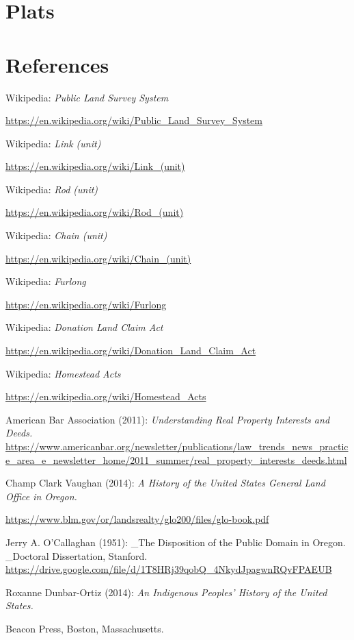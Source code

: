 \documentclass[
  12pt,
]{book}
\begin{document}
\hypertarget{plats}{%
\section{Plats}\label{plats}}

\hypertarget{references-2}{%
\section{References}\label{references-2}}

Wikipedia: \emph{Public Land Survey System}

\url{https://en.wikipedia.org/wiki/Public_Land_Survey_System}

Wikipedia: \emph{Link (unit) }

\url{https://en.wikipedia.org/wiki/Link_(unit)}

Wikipedia: \emph{Rod (unit) }

\url{https://en.wikipedia.org/wiki/Rod_(unit)}

Wikipedia: \emph{Chain (unit) }

\url{https://en.wikipedia.org/wiki/Chain_(unit)}

Wikipedia: \emph{Furlong }

\url{https://en.wikipedia.org/wiki/Furlong}

Wikipedia: \emph{Donation Land Claim Act}

\url{https://en.wikipedia.org/wiki/Donation_Land_Claim_Act}

Wikipedia: \emph{Homestead Acts }

\url{https://en.wikipedia.org/wiki/Homestead_Acts}

American Bar Association (2011): \emph{Understanding Real Property Interests and Deeds. }\url{https://www.americanbar.org/newsletter/publications/law_trends_news_practice_area_e_newsletter_home/2011_summer/real_property_interests_deeds.html}

Champ Clark Vaughan (2014): \emph{A History of the United States General Land Office in Oregon.}

\url{https://www.blm.gov/or/landsrealty/glo200/files/glo-book.pdf}

Jerry A. O'Callaghan (1951): \_The Disposition of the Public Domain in Oregon. \_Doctoral Dissertation, Stanford. \url{https://drive.google.com/file/d/1T8HRj39qobQ_4NkydJpagwnRQvFPAEUB}

Roxanne Dunbar-Ortiz (2014): \emph{An Indigenous Peoples' History of the United States.}

Beacon Press, Boston, Massachusetts.
\end{document}

